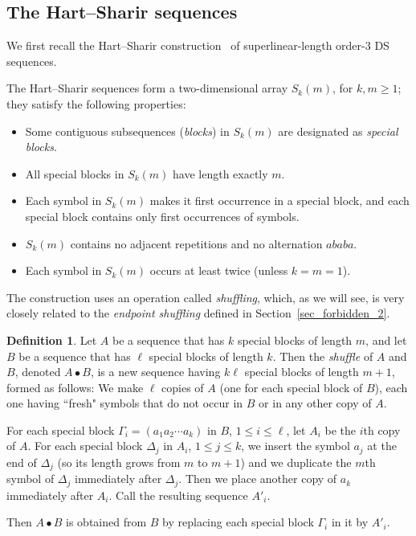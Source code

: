\documentclass[11pt]{article}
\theoremstyle{definition}
\newtheorem{definition}[theorem]{Definition}
\theoremstyle{remark}
\begin{document}
\subsection{The Hart--Sharir sequences}

We first recall the Hart--Sharir construction~\cite{HS} of superlinear-length order-$3$ DS sequences.

The Hart--Sharir sequences form a two-dimensional array $S_k(m)$, for $k,m\ge 1$; they satisfy the following properties:
\begin{itemize}
\item Some contiguous subsequences (\emph{blocks}) in $S_k(m)$ are designated as \emph{special blocks}.
\item All special blocks in $S_k(m)$ have length exactly $m$.
\item Each symbol in $S_k(m)$ makes it first occurrence in a special block, and each special block contains only first occurrences of symbols.
\item $S_k(m)$ contains no adjacent repetitions and no alternation $ababa$.
\item Each symbol in $S_k(m)$ occurs at least twice (unless $k=m=1$).
\end{itemize}

The construction uses an operation called \emph{shuffling}, which, as we will see, is very closely related to the \emph{endpoint shuffling} defined in Section~\ref{sec_forbidden_2}.

\begin{definition}
Let $A$ be a sequence that has $k$ special blocks of length $m$, and let $B$ be a sequence that has $\ell$ special blocks of length $k$. Then the \emph{shuffle} of $A$ and $B$, denoted $A\bullet B$, is a new sequence having $k\ell$ special blocks of length $m+1$, formed as follows: We make $\ell$ copies of $A$ (one for each special block of $B$), each one having ``fresh" symbols that do not occur in $B$ or in any other copy of $A$.

For each special block $\Gamma_i = (a_1 a_2 \cdots a_k)$ in $B$, $1\le i \le \ell$, let $A_i$ be the $i$th copy of $A$. For each special block $\Delta_j$ in $A_i$, $1\le j\le k$, we insert the symbol $a_j$ at the end of $\Delta_j$ (so its length grows from $m$ to $m+1$) and we duplicate the $m$th symbol of $\Delta_j$ immediately after $\Delta_j$. Then we place another copy of $a_k$ immediately after $A_i$. Call the resulting sequence $A'_i$.

Then $A\bullet B$ is obtained from $B$ by replacing each special block $\Gamma_i$ in it by $A'_i$.
\end{definition}
\end{document}
